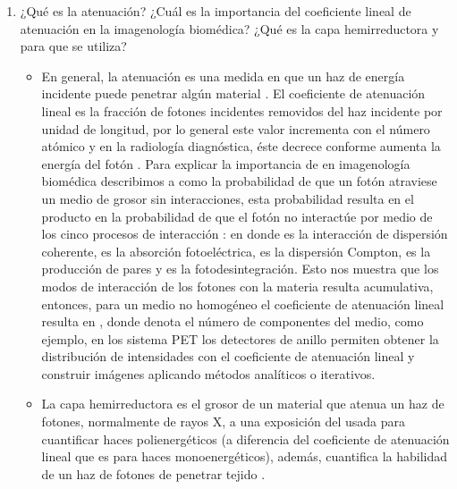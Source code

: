 \begin{enumerate}[1.]
\item ¿Qué es la atenuación? ¿Cuál es la importancia del coeficiente lineal de atenuación en la imagenología biomédica? ¿Qué es la capa hemirreductora y para que se utiliza?


\begin{itemize}
  \item En general, la atenuación es una medida en que un haz de energía incidente puede penetrar algún material \citep{huda}. El coeficiente de atenuación lineal \ec{\mu } es la fracción de fotones incidentes removidos del haz incidente por unidad de longitud, por lo general este valor incrementa con el número atómico y en la radiología diagnóstica, éste decrece conforme aumenta la energía del fotón \citep{alpen,huda}. Para explicar la importancia de \ec{\mu}  en imagenología biomédica describimos a  como la probabilidad de que un fotón atraviese un medio de grosor  sin interacciones, esta probabilidad resulta en el producto en la probabilidad de que el fotón no interactúe por medio de los cinco procesos de interacción \citep{russ}:
  en donde \ec{\omega} es la interacción de dispersión coherente, \ec{\tau} es la absorción fotoeléctrica, \ec{\sigma} es la dispersión Compton, \ec{\kappa} es la producción de pares y  \ec{\pi} es la fotodesintegración. Esto nos muestra que los modos de interacción de los fotones con la materia resulta acumulativa, entonces, para un medio no homogéneo el coeficiente de atenuación lineal resulta en , donde  denota el número de componentes del medio, como ejemplo, en los sistema PET los detectores de anillo permiten obtener la distribución de intensidades con el coeficiente de atenuación lineal y construir imágenes aplicando métodos analíticos o iterativos.
  \item La capa hemirreductora es el grosor de un material que atenua un haz de fotones, normalmente de rayos X, a una exposición del  usada para cuantificar haces polienergéticos (a diferencia del coeficiente de atenuación lineal que es para haces monoenergéticos), además, cuantifica la habilidad de un haz de fotones de penetrar tejido  \citep{russ}.
\end{itemize}














\end{enumerate}
